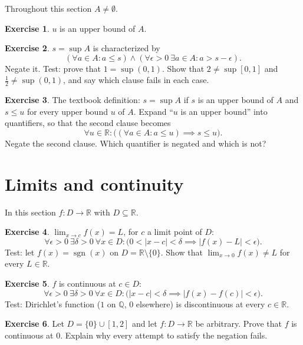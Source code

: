 \documentclass{workbook}
\theoremstyle{definition}
\newtheorem{exercise}{Exercise}[section]
\newcommand{\Q}{\mathbb{Q}}
\newcommand{\R}{\mathbb{R}}
\begin{document}
Throughout this section $A \neq \emptyset$.

\begin{exercise}\label{ex:ub}
$u$ is an upper bound of $A$.
\end{exercise}

\begin{exercise}\label{ex:sup}
$s = \sup A$ is characterized by
\[
  (\forall a \in A : a \le s) \land (\forall \epsilon > 0\ \exists a \in A : a > s - \epsilon).
\]
Negate it. Test: prove that $1 = \sup (0,1)$. Show that $2 \ne \sup [0,1]$ and $\tfrac12 \ne \sup (0,1)$, and say which clause fails in each case.
\end{exercise}

\begin{exercise}\label{ex:lub}
The textbook definition: $s = \sup A$ if $s$ is an upper bound of $A$ and $s \le u$ for every upper bound $u$ of $A$. Expand ``$u$ is an upper bound'' into quantifiers, so that the second clause becomes
\[
  \forall u \in \R : \bigl( (\forall a \in A : a \le u) \implies s \le u \bigr).
\]
Negate the second clause. Which quantifier is negated and which is not?
\end{exercise}

\section{Limits and continuity}

In this section $f \colon D \to \R$ with $D \subseteq \R$.

\begin{exercise}\label{ex:lim}
$\lim_{x \to c} f(x) = L$, for $c$ a limit point of $D$:
\[
  \forall \epsilon > 0\ \exists \delta > 0\ \forall x \in D : \bigl(0 < |x - c| < \delta \implies |f(x) - L| < \epsilon\bigr).
\]
Test: let $f(x) = \operatorname{sgn}(x)$ on $D = \R \setminus \{0\}$. Show that $\lim_{x \to 0} f(x) \ne L$ for every $L \in \R$.
\end{exercise}

\begin{exercise}\label{ex:cont}
$f$ is continuous at $c \in D$:
\[
  \forall \epsilon > 0\ \exists \delta > 0\ \forall x \in D : \bigl(|x - c| < \delta \implies |f(x) - f(c)| < \epsilon\bigr).
\]
Test: Dirichlet's function ($1$ on $\Q$, $0$ elsewhere) is discontinuous at every $c \in \R$.
\end{exercise}

\begin{exercise}\label{ex:isolated}
Let $D = \{0\} \cup [1, 2]$ and let $f \colon D \to \R$ be arbitrary. Prove that $f$ is continuous at $0$. Explain why every attempt to satisfy the negation fails.
\end{exercise}
\end{document}
